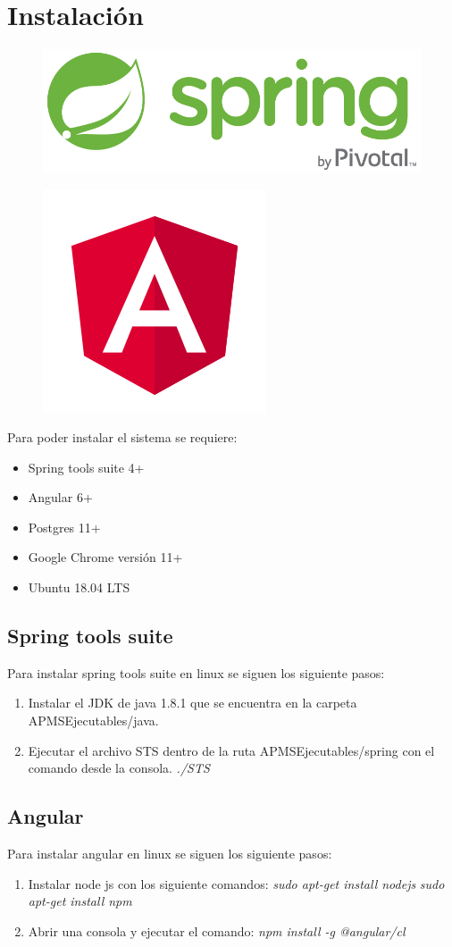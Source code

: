 \chapter{Instalación}

\begin{figure}[H]
\raggedright
\includegraphics[width=0.1\linewidth]{images/tecnologias/spring.png}
\end{figure}

\begin{figure}[H]
\raggedleft
\includegraphics[width=0.1\linewidth]{images/tecnologias/angular.png}
\end{figure}


Para poder instalar el sistema se requiere:

\begin{itemize}
	\item Spring tools suite 4+
  \item Angular 6+
  \item Postgres 11+
  \item Google Chrome versión 11+
  \item Ubuntu 18.04 LTS
\end{itemize}

\section{Spring tools suite}
Para instalar spring tools suite en linux se siguen los siguiente pasos:

\begin{enumerate}
  \item Instalar el JDK de java 1.8.1 que se encuentra en la carpeta APMSEjecutables/java.
  \item Ejecutar el archivo STS dentro de la ruta APMSEjecutables/spring con el comando desde la consola. \textit{./STS}
\end{enumerate}

\section{Angular}
Para instalar angular en linux se siguen los siguiente pasos:

\begin{enumerate}
  \item Instalar node js con los siguiente comandos:
  \textit{sudo apt-get install nodejs}
  \newline\textit{sudo apt-get install npm}
  \item Abrir una consola y ejecutar el comando:
  \textit{npm install -g @angular/cl}
\end{enumerate}

